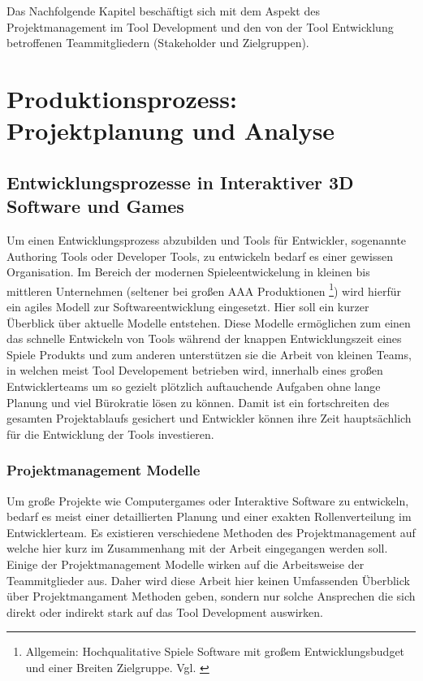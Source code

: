 \documentclass[pagesize, paper=a4, fontsize=12pt, titlepage=true, headings=small, headnosepline, abstractoff, liststotoc, nochapterprefix, plainheadsepline, twoside]{scrreprt}
\begin{document}
Das Nachfolgende Kapitel beschäftigt sich mit dem Aspekt des Projektmanagement im Tool Development und den von der Tool Entwicklung betroffenen Teammitgliedern (Stakeholder und Zielgruppen).

\chapter{Produktionsprozess: Projektplanung und Analyse}
\section{Entwicklungsprozesse in Interaktiver 3D Software und Games}
Um einen Entwicklungsprozess abzubilden und Tools für Entwickler, sogenannte Authoring Tools oder Developer Tools, zu entwickeln bedarf es einer gewissen Organisation. Im Bereich der modernen Spieleentwickelung in kleinen bis mittleren Unternehmen (seltener bei großen AAA Produktionen \footnote{Allgemein: Hochqualitative Spiele Software mit großem Entwicklungsbudget und einer Breiten Zielgruppe. Vgl. \cite{GamasutraAAA2005} }) wird hierfür ein agiles Modell zur Softwareentwicklung eingesetzt. Hier soll ein kurzer Überblick über aktuelle Modelle entstehen. Diese Modelle ermöglichen zum einen das schnelle Entwickeln von Tools während der knappen Entwicklungszeit eines Spiele Produkts und zum anderen unterstützen sie die Arbeit von kleinen Teams, in welchen meist Tool Developement betrieben wird,  innerhalb eines großen Entwicklerteams um so gezielt plötzlich auftauchende Aufgaben ohne lange Planung und viel Bürokratie lösen zu können. Damit ist ein fortschreiten des gesamten Projektablaufs gesichert und Entwickler können ihre Zeit hauptsächlich für die Entwicklung der Tools investieren.

\subsection{Projektmanagement Modelle}
Um große Projekte wie Computergames oder Interaktive Software zu entwickeln, bedarf es meist einer detaillierten Planung und einer exakten Rollenverteilung im Entwicklerteam. Es existieren verschiedene Methoden des Projektmanagement auf welche hier kurz im Zusammenhang mit der Arbeit eingegangen werden soll. Einige der Projektmanagement Modelle wirken auf die Arbeitsweise der Teammitglieder aus. Daher wird diese Arbeit hier keinen Umfassenden Überblick über Projektmangament Methoden geben, sondern nur solche Ansprechen die sich direkt oder indirekt stark auf das Tool Development auswirken.
\end{document}
